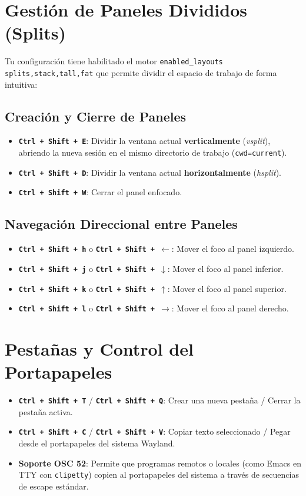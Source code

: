 \documentclass[11pt,article,spanish]{apuntes-scr}
\begin{document}
\section{Gestión de Paneles Divididos (Splits)}
Tu configuración tiene habilitado el motor \texttt{enabled\_layouts splits,stack,tall,fat} que permite dividir el espacio de trabajo de forma intuitiva:

\subsection{Creación y Cierre de Paneles}
\begin{itemize}[leftmargin=*]
    \item \textbf{\texttt{Ctrl + Shift + E}}: Dividir la ventana actual \textbf{verticalmente} (\textit{vsplit}), abriendo la nueva sesión en el mismo directorio de trabajo (\texttt{cwd=current}).
    \item \textbf{\texttt{Ctrl + Shift + D}}: Dividir la ventana actual \textbf{horizontalmente} (\textit{hsplit}).
    \item \textbf{\texttt{Ctrl + Shift + W}}: Cerrar el panel enfocado.
\end{itemize}

\subsection{Navegación Direccional entre Paneles}
\begin{itemize}[leftmargin=*]
    \item \textbf{\texttt{Ctrl + Shift + h}} o \textbf{\texttt{Ctrl + Shift + $\leftarrow$}}: Mover el foco al panel izquierdo.
    \item \textbf{\texttt{Ctrl + Shift + j}} o \textbf{\texttt{Ctrl + Shift + $\downarrow$}}: Mover el foco al panel inferior.
    \item \textbf{\texttt{Ctrl + Shift + k}} o \textbf{\texttt{Ctrl + Shift + $\uparrow$}}: Mover el foco al panel superior.
    \item \textbf{\texttt{Ctrl + Shift + l}} o \textbf{\texttt{Ctrl + Shift + $\rightarrow$}}: Mover el foco al panel derecho.
\end{itemize}

\section{Pestañas y Control del Portapapeles}
\begin{itemize}[leftmargin=*]
    \item \textbf{\texttt{Ctrl + Shift + T}} / \textbf{\texttt{Ctrl + Shift + Q}}: Crear una nueva pestaña / Cerrar la pestaña activa.
    \item \textbf{\texttt{Ctrl + Shift + C}} / \textbf{\texttt{Ctrl + Shift + V}}: Copiar texto seleccionado / Pegar desde el portapapeles del sistema Wayland.
    \item \textbf{Soporte OSC 52}: Permite que programas remotos o locales (como Emacs en TTY con \texttt{clipetty}) copien al portapapeles del sistema a través de secuencias de escape estándar.
\end{itemize}
\end{document}
